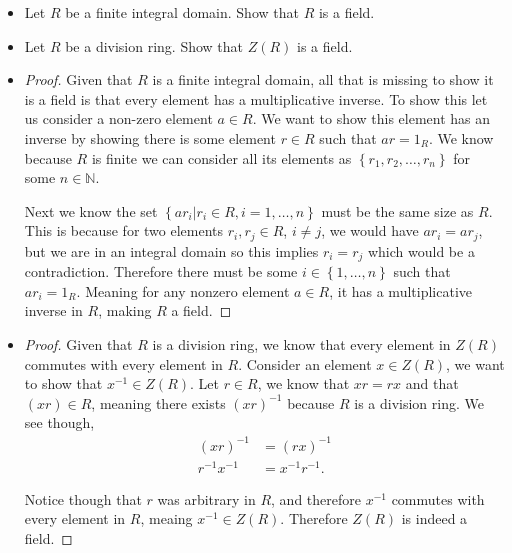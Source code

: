 \documentclass[11pt]{article}
\newenvironment{problem}[2][Problem\!]{\begin{trivlist}
\item[\hskip \labelsep {\bfseries #1}\hskip \labelsep {\bfseries #2}]}{\end{trivlist}}
\newcommand{\nn}{\mathbb N}   %
\newcommand{\set}[1]{\left\{#1\right\}} %
\begin{document}
\begin{tcolorbox}
  \begin{problem} {9.2}
    \begin{itemize}
        \item[(a)] Let $R$ be a finite integral domain. Show that $R$ is a field.
        \item[(b)] Let $R$ be a division ring. Show that $Z(R)$ is a field. 
    \end{itemize}
  \end{problem}
\end{tcolorbox}
\begin{itemize}
    \item[(a)]
    \begin{proof}
        Given that $R$ is a finite integral domain, all that is missing to show it is a field is that every element has a multiplicative inverse. To show this let us consider a non-zero element $a\in R$. We want to show this element has an inverse by showing there is some element $r \in R$ such that $ar = 1_R$. We know because $R$ is finite we can consider all its elements as $\set{r_1, r_2, \dots, r_n}$ for some $n \in \nn$. 

        Next we know the set $\set{ar_i | r_i \in R, i = 1, \dots, n}$ must be the same size as $R$. This is because for two elements $r_i, r_j \in R$, $i \neq j$, we would have $ar_i = ar_j$, but we are in an integral domain so this implies $r_i = r_j$ which would be a contradiction. Therefore there must be some $i \in \set{1, \dots, n}$ such that $ar_i = 1_R$. Meaning for any nonzero element $a \in R$, it has a multiplicative inverse in $R$, making $R$ a field.
    \end{proof} 
    \item[(b)]
    \begin{proof}
        Given that $R$ is a division ring, we know that every element in $Z(R)$ commutes with every element in $R$. Consider an element $x \in Z(R)$, we want to show that $x^{-1}\in Z(R)$. Let $r \in R$, we know that $xr = rx$ and that $(xr) \in R$, meaning there exists $(xr)^{-1}$ because $R$ is a division ring. We see though,
        \begin{align*}
            (xr)^{-1} &= (rx)^{-1} \\
            r^{-1}x^{-1} &= x^{-1}r^{-1}.            
        \end{align*}

        Notice though that $r$ was arbitrary in $R$, and therefore $x^{-1}$ commutes with every element in $R$, meaing $x^{-1} \in Z(R)$. Therefore $Z(R)$ is indeed a field. 
    \end{proof} 
\end{itemize}
\end{document}
